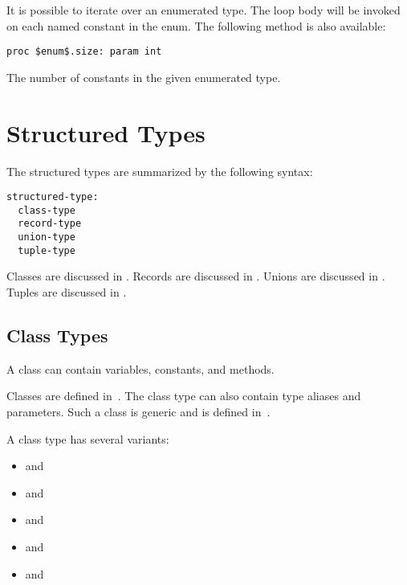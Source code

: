 It is possible to iterate over an enumerated type. The loop body will be
invoked on each named constant in the enum.
The following method is also available:

\begin{protohead}
\begin{verbatim}
proc $enum$.size: param int
\end{verbatim}
\end{protohead}
\begin{protobody}
The number of constants in the given enumerated type.
\end{protobody}

\clearpage
\section{Structured Types}
\label{Structured_Types}

The structured types are summarized by the following syntax:

\begin{syntax}
\begin{verbatim}
structured-type:
  class-type
  record-type
  union-type
  tuple-type
\end{verbatim}
\end{syntax}

Classes are discussed in .  Records are discussed
in .  Unions are discussed in .  Tuples are
discussed in .

\subsection{Class Types}
\label{Types_Class_Types}

A class can contain variables, constants, and methods.

Classes are defined
in~.  The class type can also contain type aliases and
parameters.  Such a class is generic and is defined
in~.

A class type  has several variants:
\begin{itemize}
  \item {} and 
  \item {} and 
  \item {} and 
  \item {} and 
  \item {} and 
\end{itemize}

